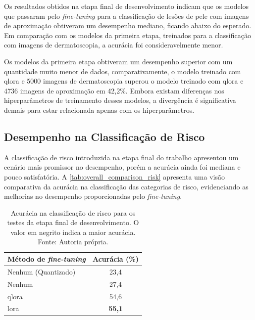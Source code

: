 Os resultados obtidos na etapa final de desenvolvimento indicam que os modelos que passaram pelo \textit{fine-tuning}
para a classificação de lesões de pele com imagens de aproximação obtiveram um desempenho mediano, ficando abaixo do
esperado. Em comparação com os modelos da primeira etapa, treinados para a classificação com imagens de dermatoscopia,
a acurácia foi consideravelmente menor.

Os modelos da primeira etapa obtiveram um desempenho superior com um quantidade muito menor de dados, comparativamente,
o modelo treinado com \ac{qlora} e 5000 imagens de dermatoscopia superou o modelo treinado com \ac{qlora} e 4736
imagens de aproximação em 42,2\%. Embora existam diferenças nos hiperparâmetros de treinamento desses modelos, a
divergência é significativa demais para estar relacionada apenas com os hiperparâmetros.

\subsection{Desempenho na Classificação de Risco}

A classificação de risco introduzida na etapa final do trabalho apresentou um cenário mais promissor no desempenho,
porém a acurácia ainda foi mediana e pouco satisfatória. A \autoref{tab:overall_comparison_risk} apresenta uma visão
comparativa da acurácia na classificação das categorias de risco, evidenciando as melhorias no desempenho
proporcionadas pelo \textit{fine-tuning}.

\begin{table}[ht]
    \centering
    \begin{tabular}{l|c}
        \hline
        Método de \textit{fine-tuning} & Acurácia (\%) \\ \hline
        Nenhum (Quantizado)            & 23,4          \\
        Nenhum                         & 27,4          \\
        \ac{qlora}                     & 54,6          \\
        \ac{lora}                      & \textbf{55,1} \\ \hline
    \end{tabular}
    \label{tab:overall_comparison_risk}
    \caption{Acurácia na classificação de risco para os testes da etapa final de desenvolvimento. O valor em
    negrito indica a maior acurácia. Fonte: Autoria própria.}
\end{table}

